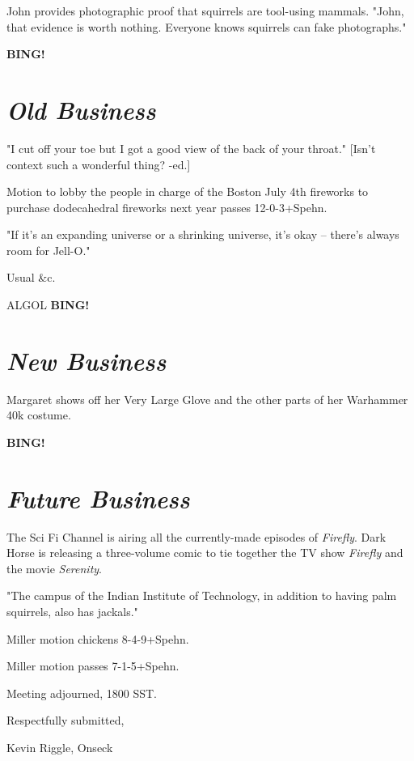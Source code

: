 \documentclass[10pt]{article}
\newcommand{\bing}{{\bf BING!} }
\newcommand{\goto}[1]{\bing \vskip 12pt \section*{{\em{#1}}}}
\begin{document}
John provides photographic proof that squirrels are tool-using mammals.
"John, that evidence is worth nothing.  Everyone knows squirrels can fake
photographs."

\goto{Old Business}

"I cut off your toe but I got a good view of the back of your throat."
[Isn't context such a wonderful thing? -ed.]

Motion to lobby the people in charge of the Boston July 4th fireworks to purchase
dodecahedral fireworks next year passes 12-0-3+Spehn.

"If it's an expanding universe or a shrinking universe, it's okay -- there's 
always room for Jell-O."

Usual &c.

ALGOL  
\goto{New Business}
Margaret shows off her Very Large Glove and the other parts of her Warhammer 
40k costume.

\goto{Future Business}

The Sci Fi Channel is airing all the currently-made episodes of {\em Firefly}.
Dark Horse is releasing a three-volume comic to tie together the TV show {\em Firefly} 
and the movie {\em Serenity}.

"The campus of the Indian Institute of Technology, in addition to having palm
squirrels, also has jackals." 

Miller motion chickens 8-4-9+Spehn.

Miller motion passes 7-1-5+Spehn.

\vspace{12pt}

\noindent
Meeting adjourned, 1800 SST.

\vspace{18pt}

\centerline{Respectfully submitted,}
\centerline{Kevin Riggle, Onseck}
\end{document}
